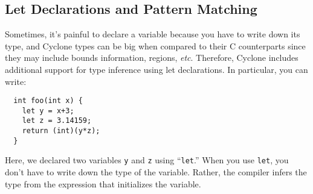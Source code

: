 
\subsection{Let Declarations and Pattern Matching}

Sometimes, it's painful to declare a variable because you have to
write down its type, and Cyclone types can be big when compared
to their C counterparts since they may include bounds information,
regions, \emph{etc}.  Therefore, Cyclone includes additional support for type
inference using let declarations.  In particular, you can write:
\begin{verbatim}
  int foo(int x) {
    let y = x+3;
    let z = 3.14159;
    return (int)(y*z);
  }
\end{verbatim}
Here, we declared two variables \texttt{y} and \texttt{z} using
``\texttt{let}.''  When you use \texttt{let}, you don't have to write
down the type of the variable.  Rather, the compiler infers the type
from the expression that initializes the variable.

